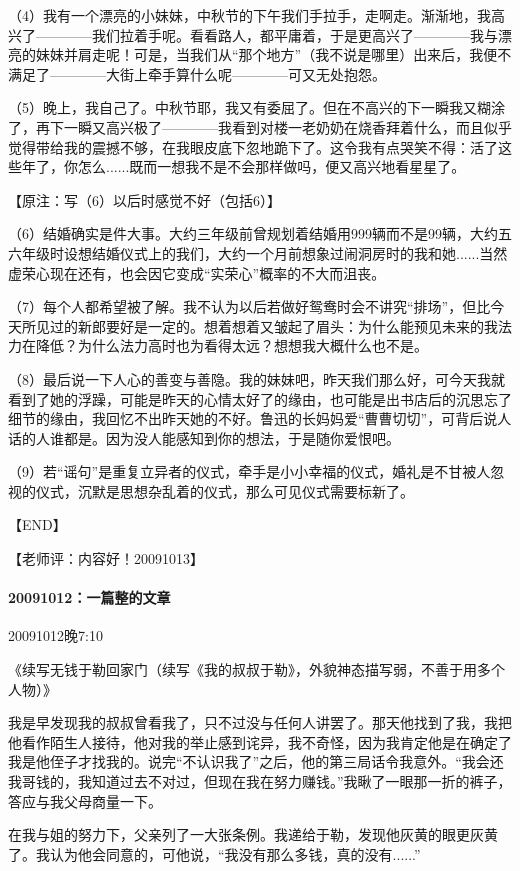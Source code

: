 \documentclass[UTF8]{Diaries}
\begin{document}
（4）我有一个漂亮的小妹妹，中秋节的下午我们手拉手，走啊走。渐渐地，我高兴了————我们拉着手呢。看看路人，都平庸着，于是更高兴了————我与漂亮的妹妹并肩走呢！可是，当我们从“那个地方”（我不说是哪里）出来后，我便不满足了————大街上牵手算什么呢————可又无处抱怨。

（5）晚上，我自己了。中秋节耶，我又有委屈了。但在不高兴的下一瞬我又糊涂了，再下一瞬又高兴极了————我看到对楼一老奶奶在烧香拜着什么，而且似乎觉得带给我的震撼不够，在我眼皮底下忽地跪下了。这令我有点哭笑不得：活了这些年了，你怎么......既而一想我不是不会那样做吗，便又高兴地看星星了。

【原注：写（6）以后时感觉不好（包括6）】

（6）结婚确实是件大事。大约三年级前曾规划着结婚用999辆而不是99辆，大约五六年级时设想结婚仪式上的我们，大约一个月前想象过闹洞房时的我和她......当然虚荣心现在还有，也会因它变成“实荣心”概率的不大而沮丧。

（7）每个人都希望被了解。我不认为以后若做好鸳鸯时会不讲究“排场”，但比今天所见过的新郎要好是一定的。想着想着又皱起了眉头：为什么能预见未来的我法力在降低？为什么法力高时也为看得太远？想想我大概什么也不是。

（8）最后说一下人心的善变与善隐。我的妹妹吧，昨天我们那么好，可今天我就看到了她的浮躁，可能是昨天的心情太好了的缘由，也可能是出书店后的沉思忘了细节的缘由，我回忆不出昨天她的不好。鲁迅的长妈妈爱“曹曹切切”，可背后说人话的人谁都是。因为没人能感知到你的想法，于是随你爱恨吧。

（9）若“谣句”是重复立异者的仪式，牵手是小小幸福的仪式，婚礼是不甘被人忽视的仪式，沉默是思想杂乱着的仪式，那么可见仪式需要标新了。

【END】

【老师评：内容好！20091013】


\paragraph{20091012：一篇整的文章}
20091012晚7:10

《续写无钱于勒回家门（续写《我的叔叔于勒》，外貌神态描写弱，不善于用多个人物）》

我是早发现我的叔叔曾看我了，只不过没与任何人讲罢了。那天他找到了我，我把他看作陌生人接待，他对我的举止感到诧异，我不奇怪，因为我肯定他是在确定了我是他侄子才找我的。说完“不认识我了”之后，他的第三局话令我意外。“我会还我哥钱的，我知道过去不对过，但现在我在努力赚钱。”我瞅了一眼那一折的裤子，答应与我父母商量一下。

在我与姐的努力下，父亲列了一大张条例。我递给于勒，发现他灰黄的眼更灰黄了。我认为他会同意的，可他说，“我没有那么多钱，真的没有......”
\end{document}
